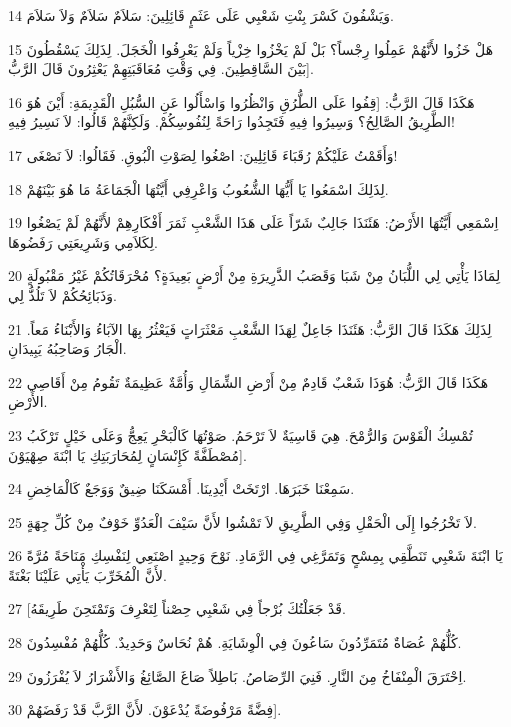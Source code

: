 \par 14 وَيَشْفُونَ كَسْرَ بِنْتِ شَعْبِي عَلَى عَثَمٍ قَائِلِينَ: سَلاَمٌ سَلاَمٌ وَلاَ سَلاَمَ.
\par 15 هَلْ خَزُوا لأَنَّهُمْ عَمِلُوا رِجْساً؟ بَلْ لَمْ يَخْزُوا خِزْياً وَلَمْ يَعْرِفُوا الْخَجَلَ. لِذَلِكَ يَسْقُطُونَ بَيْنَ السَّاقِطِينَ. فِي وَقْتِ مُعَاقَبَتِهِمْ يَعْثِرُونَ قَالَ الرَّبُّ].
\par 16 هَكَذَا قَالَ الرَّبُّ: [قِفُوا عَلَى الطُّرُقِ وَانْظُرُوا وَاسْأَلُوا عَنِ السُّبُلِ الْقَدِيمَةِ: أَيْنَ هُوَ الطَّرِيقُ الصَّالِحُ؟ وَسِيرُوا فِيهِ فَتَجِدُوا رَاحَةً لِنُفُوسِكُمْ. وَلَكِنَّهُمْ قَالُوا: لاَ نَسِيرُ فِيهِ!
\par 17 وَأَقَمْتُ عَلَيْكُمْ رُقَبَاءَ قَائِلِينَ: اصْغُوا لِصَوْتِ الْبُوقِ. فَقَالُوا: لاَ نَصْغَى!
\par 18 لِذَلِكَ اسْمَعُوا يَا أَيُّهَا الشُّعُوبُ وَاعْرِفِي أَيَّتُهَا الْجَمَاعَةُ مَا هُوَ بَيْنَهُمْ.
\par 19 اِسْمَعِي أَيَّتُهَا الأَرْضُ: هَئَنَذَا جَالِبٌ شَرّاً عَلَى هَذَا الشَّعْبِ ثَمَرَ أَفْكَارِهِمْ لأَنَّهُمْ لَمْ يَصْغُوا لِكَلاَمِي وَشَرِيعَتِي رَفَضُوهَا.
\par 20 لِمَاذَا يَأْتِي لِي اللُّبَانُ مِنْ شَبَا وَقَصَبُ الذَّرِيرَةِ مِنْ أَرْضٍ بَعِيدَةٍ؟ مُحْرَقَاتُكُمْ غَيْرُ مَقْبُولَةٍ وَذَبَائِحُكُمْ لاَ تَلُذُّ لِي.
\par 21 لِذَلِكَ هَكَذَا قَالَ الرَّبُّ: هَئَنَذَا جَاعِلٌ لِهَذَا الشَّعْبِ مَعْثَرَاتٍ فَيَعْثُرُ بِهَا الآبَاءُ وَالأَبْنَاءُ مَعاً. الْجَارُ وَصَاحِبُهُ يَبِيدَانِ.
\par 22 هَكَذَا قَالَ الرَّبُّ: هُوَذَا شَعْبٌ قَادِمٌ مِنْ أَرْضِ الشِّمَالِ وَأُمَّةٌ عَظِيمَةٌ تَقُومُ مِنْ أَقَاصِي الأَرْضِ.
\par 23 تُمْسِكُ الْقَوْسَ وَالرُّمْحَ. هِيَ قَاسِيَةٌ لاَ تَرْحَمُ. صَوْتُهَا كَالْبَحْرِ يَعِجُّ وَعَلَى خَيْلٍ تَرْكَبُ مُصْطَفَّةً كَإِنْسَانٍ لِمُحَارَبَتِكِ يَا ابْنَةَ صِهْيَوْنَ].
\par 24 سَمِعْنَا خَبَرَهَا. ارْتَخَتْ أَيْدِينَا. أَمْسَكَنَا ضِيقٌ وَوَجَعٌ كَالْمَاخِضِ.
\par 25 لاَ تَخْرُجُوا إِلَى الْحَقْلِ وَفِي الطَّرِيقِ لاَ تَمْشُوا لأَنَّ سَيْفَ الْعَدُوِّ خَوْفٌ مِنْ كُلِّ جِهَةٍ.
\par 26 يَا ابْنَةَ شَعْبِي تَنَطَّقِي بِمِسْحٍ وَتَمَرَّغِي فِي الرَّمَادِ. نَوْحَ وَحِيدٍ اصْنَعِي لِنَفْسِكِ مَنَاحَةً مُرَّةً لأَنَّ الْمُخَرِّبَ يَأْتِي عَلَيْنَا بَغْتَةً.
\par 27 [قَدْ جَعَلْتُكَ بُرْجاً فِي شَعْبِي حِصْناً لِتَعْرِفَ وَتَمْتَحِنَ طَرِيقَهُ.
\par 28 كُلُّهُمْ عُصَاةٌ مُتَمَرِّدُونَ سَاعُونَ فِي الْوِشَايَةِ. هُمْ نُحَاسٌ وَحَدِيدٌ. كُلُّهُمْ مُفْسِدُونَ.
\par 29 اِحْتَرَقَ الْمِنْفَاخُ مِنَ النَّارِ. فَنِيَ الرِّصَاصُ. بَاطِلاً صَاغَ الصَّائِغُ وَالأَشْرَارُ لاَ يُفْرَزُونَ.
\par 30 فِضَّةً مَرْفُوضَةً يُدْعَوْنَ. لأَنَّ الرَّبَّ قَدْ رَفَضَهُمْ].

